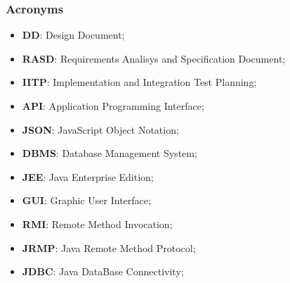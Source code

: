 \subsubsection{Acronyms}
\begin{itemize}
	\item \textbf{DD}: Design Document;
	\item \textbf{RASD}: Requirements Analisys and Specification Document;
	\item \textbf{IITP}: Implementation and Integration Test Planning;
	\item \textbf{API}: Application Programming Interface;
	\item \textbf{JSON}: JavaScript Object Notation;
	\item \textbf{DBMS}: Database Management System;
	\item \textbf{JEE}: Java Enterprise Edition;
	\item \textbf{GUI}: Graphic User Interface;
	\item \textbf{RMI}: Remote Method Invocation;
	\item \textbf{JRMP}: Java Remote Method Protocol;
	\item \textbf{JDBC}: Java DataBase Connectivity;
\end{itemize}

